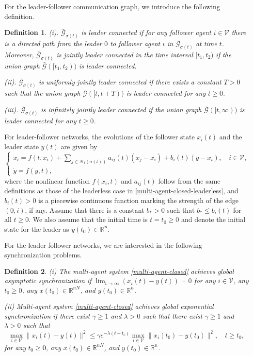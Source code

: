 \documentclass[a4paper, 11pt]{article}
\newtheorem{definition}{Definition}
\def\R{\mathbb{R}}
\begin{document}
For the leader-follower communication graph, we introduce the following definition.
\begin{definition}\label{def-connected-leader}
(i). $\bar{\mathcal{G}}_{\sigma(t)}$ is \emph{leader connected} if
for any follower agent $i \in \mathcal{V}$
there is a directed path from the leader $0$ to follower agent $i$ in $\bar{\mathcal{G}}_{\sigma(t)}$
at time $t$.
Moreover, $\bar{\mathcal{G}}_{\sigma(t)}$ is \emph{jointly leader connected} in the time interval $[t_1,t_2)$ if the union graph $\bar{\mathcal{G}}([t_1,t_2))$ is leader connected.

(ii). $\bar{\mathcal{G}}_{\sigma(t)}$ is {\emph{uniformly jointly leader connected}} if there exists a constant $T>0$ such that the union graph $\bar{\mathcal{G}}([t,t+T))$ is leader connected for any $t \geq 0$.

(iii). $\bar{\mathcal{G}}_{\sigma(t)}$ is {\emph{infinitely jointly leader connected}} if the union graph $\bar{\mathcal{G}}([t, \infty))$ is leader connected for any $t \geq 0$.
\end{definition}

For leader-follower  networks, the evolutions of the follower state $x_i(t)$ and the leader state
$y(t)$ are given by
\begin{equation}\label{multi-agent-closed}
\begin{cases}
\dot{x}_i= f(t,x_i) + \sum _{j \in \mathcal{N}_i(\sigma(t))} a_{ij}(t)(x_j-x_i)+b_i(t)(y-x_i), \quad i \in \mathcal{V}, \\
\dot{y} = f(y,t),
\end{cases}
\end{equation}
where the nonlinear function $f(x_i,t)$ and $a_{ij}(t)$ follow from the same definitions as those of the leaderless case in \eqref{multi-agent-closed-leaderless}, and $b_i(t)>0$ is a piecewise continuous function marking  the strength of the edge $(0,i)$, if any. Assume that there is a constant $b_*>0$ such that $b_* \leq b_i(t)$ for all $t \geq 0$. We also 
assume that the initial time is $t=t_0\geq 0$ and denote the initial state for the leader as $y(t_0) \in {\R}^n$.

For the leader-follower networks, we are interested in the following synchronization problems.


\begin{definition}\label{lf-syn-asy}
(i) The multi-agent system \eqref{multi-agent-closed} achieves global asymptotic synchronization if
$\lim_{t\to \infty}(x_i(t)-y(t))=0$ for any $i \in\mathcal{V}$, any $t_0 \geq 0$, any $x(t_0) \in {\R}^{nN}$, and $y(t_0) \in {\R}^n$.

(ii) Multi-agent system \eqref{multi-agent-closed} achieves global exponential synchronization if there exist $\gamma \geq 1$ and $\lambda>0$ such that
there exist $\gamma \geq 1$ and $\lambda>0$ such that
\begin{equation}\label{global-expo-LF}
\max_{i \in \mathcal{V}} \|x_i(t)-y(t)\|^2 \leq \gamma e^{-\lambda(t-t_0)} \max_{i \in \mathcal{V}}\|x_i(t_0)-y(t_0)\|^2, \quad t\geq t_0,
\end{equation}
for any $t_0 \geq 0$, any $x(t_0) \in {\R}^{nN}$, and $y(t_0) \in {\R}^n$.
\end{definition}
\end{document}
